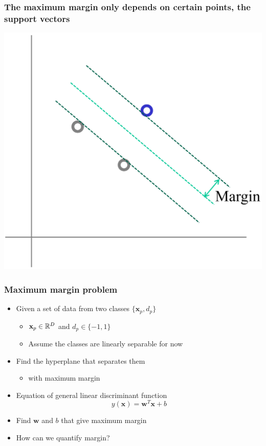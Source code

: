 \documentclass[12pt,notes,mathserif]{beamer}
\begin{document}
\begin{frame}[c]
	\frametitle{The maximum margin only depends on certain points, the support vectors}
	\begin{center}
		\includegraphics[width=0.7\linewidth]{fig8/lec810.jpg}
	\end{center}
\end{frame}


\begin{frame}[c]
	\frametitle{Maximum margin problem}
	\begin{itemize}
		\item  Given a set of data from two classes $\{\mathbf{x}_p,d_p\}$
		      \begin{itemize}
			      \item $\mathbf{x}_p\in \mathbb{R}^D$ and $d_p\in\{-1,1\}$
			      \item Assume the classes are linearly separable for now
		      \end{itemize}
		\item Find the hyperplane that separates them
		      \begin{itemize}
			      \item with maximum margin
		      \end{itemize}
		\item Equation of general linear discriminant function
		      \[y(\mathbf{x})=\mathbf{w}^T\mathbf{x}+b\]

		\item Find $\mathbf{w}$ and $b$ that give maximum margin
		\item How can we quantify margin?
	\end{itemize}

\end{frame}
\end{document}
